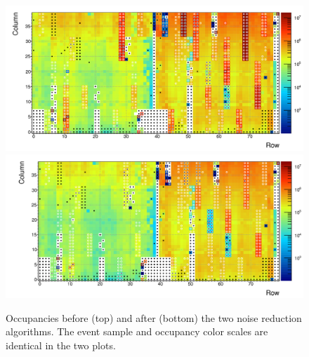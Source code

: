 \begin{figure}[htbp]\centering
  \includegraphics[width=12.3cm]{fig_rtpc/Occ2d_norej2.png}
  \includegraphics[width=12cm,trim={1.9cm 0 0 0},clip]{fig_rtpc/Occ2d_rej.png}
  \caption{Occupancies before (top) and after (bottom) the two noise reduction algorithms.  The event sample and occupancy color scales are identical in the two plots.\label{fig:occ_noiserej}}
\end{figure}


\clearpage
